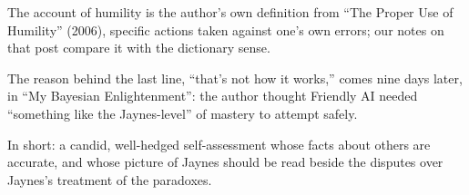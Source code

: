 \begin{afterword}
The account of humility is the author's own definition from ``The Proper Use of Humility'' (2006), specific actions taken against one's own errors; our notes on that post compare it with the dictionary sense.

The reason behind the last line, ``that's not how it works,'' comes nine days later, in ``My Bayesian Enlightenment'': the author thought Friendly AI needed ``something like the Jaynes-level'' of mastery to attempt safely.

In short: a candid, well-hedged self-assessment whose facts about others are accurate, and whose picture of Jaynes should be read beside the disputes over Jaynes's treatment of the paradoxes.
\end{afterword}
